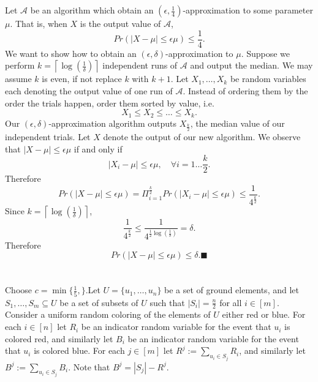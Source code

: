 \documentclass[letterpaper,12pt,oneside,onecolumn]{article}
\newcommand{\cA}{\mathcal{A}} \newcommand{\cB}{\mathcal{B}}
\newcommand{\ceil}[1]{\ensuremath{\left\lceil#1\right\rceil}}
\begin{document}
\section{}
\paragraph{}
Let $\cA$ be an algorithm which obtain an $(\epsilon, \frac{1}{4})$-approximation to some parameter $\mu$. That is, when $X$ is the output value of $\cA$,
$$Pr(|X - \mu| \leq \epsilon\mu) \leq \frac{1}{4}.$$
We want to show how to obtain an $(\epsilon,\delta)$-approximation to $\mu$. Suppose we perform $k = \ceil{\log(\frac{1}{\delta})}$ independent runs of $\cA$ and output the median. We may assume $k$ is even, if not replace $k$ with $k+1$. Let $X_1, \dots, X_k$ be random variables each denoting the output value of one run of $\cA$. Instead of ordering them by the order the trials happen, order them sorted by value, i.e.
$$X_1 \leq X_2 \leq \dots\leq X_k.$$
Our $(\epsilon,\delta)$-approximation algorithm outputs $X_\frac{k}{2}$, the median value of our independent trials. Let $X$ denote the output of our new algorithm. We observe that $|X - \mu|\leq \epsilon \mu$ if and only if 
$$|X_i - \mu | \leq \epsilon \mu, \quad \forall i=1 \dots \frac{k}{2}.$$
Therefore
$$Pr(|X-\mu| \leq \epsilon \mu) = \Pi_{i=1}^\frac{k}{2} Pr(|X_i - \mu| \leq \epsilon \mu) \leq \frac{1}{4^\frac{k}{2}}.$$
Since $k = \ceil{\log(\frac{1}{\delta})}$,
$$\frac{1}{4^\frac{k}{2}} \leq \frac{1}{4^{\frac{1}{2}\log(\frac{1}{\delta})}} = \delta.$$
Therefore
$$Pr(|X-\mu| \leq \epsilon \mu) \leq \delta. \blacksquare$$
\newpage
\section{}
\paragraph{}
Choose $c = \min \{\frac{1}{5}, \}$.Let $U = \{u_1,\dots, u_n\}$ be a set of ground elements, and let $S_1, \dots, S_m \subseteq U$ be a set of subsets of $U$ such that $|S_i| = \frac{n}{2}$ for all $i\in [m]$. Consider a uniform random coloring of the elements of $U$ either red or blue. For each $i \in [n]$ let $R_i$ be an indicator random variable for the event that $u_i$ is colored red, and similarly let $B_i$ be an indicator random variable for the event that $u_i$ is colored blue. For each $j \in [m]$ let $R^j := \sum_{u_i \in S_j} R_i$, and similarly let $B^j := \sum_{u_i \in S_j} B_i$. Note that $B^j = |S_j| - R^j$.
\end{document}
